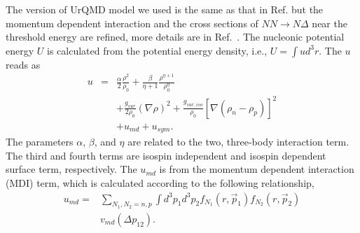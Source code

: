 \documentclass[reprint,aps,prc,twocolumn,superscriptaddress]{revtex4-1}
\begin{document}
The version of UrQMD model we used is the same as that in Ref.\cite{YYLiu2021PRC} but the momentum dependent interaction and the cross sections of $NN\to N\Delta$ near the threshold energy are refined, more details are in Ref.~\cite{YYLiu2022arXiv}. %
The nucleonic potential energy $U$ is calculated from the potential energy density, i.e., $U=\int u d^3 r$. The $u$ reads as
\begin{eqnarray}
u & =& \frac{\alpha}{2}\frac{\rho^2}{\rho_0}+\frac{\beta}{\eta+1}\frac{\rho^{\eta+1}}{\rho_0^\eta}\\\nonumber
&& +\frac{g_{sur}}{2\rho_0}(\nabla \rho)^2+\frac{g_{sur,iso}}{\rho_0}[\nabla(\rho_n-\rho_p)]^2\\\nonumber
&&+u_{md}+u_{sym}.
\end{eqnarray}
The parameters $\alpha$, $\beta$, and $\eta$ are related to the two, three-body interaction term. The third and fourth terms are isospin independent and isospin dependent surface term, respectively. The $u_{md}$ is from the momentum dependent interaction (MDI) term, which is calculated according to the following relationship,
\begin{equation}
\begin{aligned}
u_{m d}=& \sum_{N_1,N_2=n,p}\int d^{3} p_{1} d^{3} p_{2} f_{N_1}\left(r,\vec{p}_{1}\right) f_{N_2}\left(r,\vec{p}_{2}\right)\\
& v_{md}(\Delta p_{12}).
\end{aligned}
\end{equation}
\end{document}
